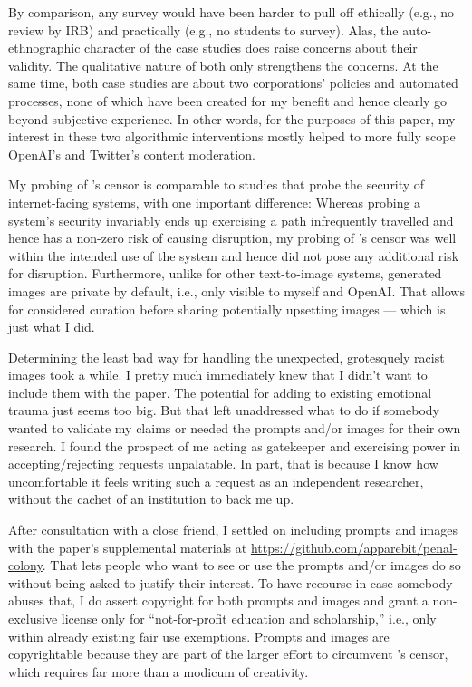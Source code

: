 By comparison, any survey would have been harder to pull off ethically (e.g., no
review by IRB) and practically (e.g., no students to survey). Alas, the
auto-ethnographic character of the case studies does raise concerns about their
validity. The qualitative nature of both only strengthens the concerns. At the
same time, both case studies are about two corporations' policies and automated
processes, none of which have been created for my benefit and hence clearly go
beyond subjective experience. In other words, for the purposes of this paper, my
interest in these two algorithmic interventions mostly helped to more fully
scope OpenAI's and Twitter's content moderation.

My probing of \DALLE's censor is comparable to studies that probe the security
of internet-facing systems, with one important difference: Whereas probing a
system's security invariably ends up exercising a path infrequently travelled
and hence has a non-zero risk of causing disruption, my probing of \DALLE's
censor was well within the intended use of the system and hence did not pose any
additional risk for disruption. Furthermore, unlike for other text-to-image
systems, generated images are private by default, i.e., only visible to myself
and OpenAI. That allows for considered curation before sharing potentially
upsetting images --- which is just what I did.

Determining the least bad way for handling the unexpected, grotesquely racist
images took a while. I pretty much immediately knew that I didn't want to
include them with the paper. The potential for adding to existing emotional
trauma just seems too big. But that left unaddressed what to do if somebody
wanted to validate my claims or needed the prompts and/or images for their own
research. I found the prospect of me acting as gatekeeper and exercising power
in accepting/rejecting requests unpalatable. In part, that is because I know how
uncomfortable it feels writing such a request as an independent researcher,
without the cachet of an institution to back me up.

After consultation with a close friend, I settled on including prompts and
images with the paper's supplemental materials at
\url{https://github.com/apparebit/penal-colony}. That lets people who want to
see or use the prompts and/or images do so without being asked to justify their
interest. To have recourse in case somebody abuses that, I do assert copyright
for both prompts and images and grant a non-exclusive license only for
``not-for-profit education and scholarship,'' i.e., only within already existing
fair use exemptions. Prompts and images are copyrightable because they are part
of the larger effort to circumvent \DALLE's censor, which requires far more than
a modicum of creativity.

